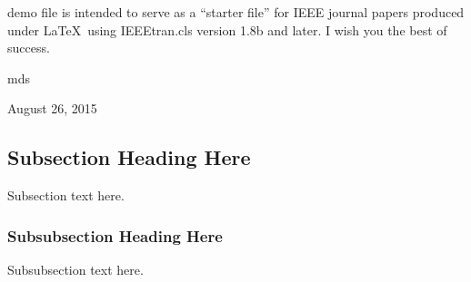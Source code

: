 \documentclass[journal]{IEEEtran}
\begin{document}
 demo file is intended to serve as a ``starter file''
for IEEE journal papers produced under \LaTeX\ using
IEEEtran.cls version 1.8b and later.
I wish you the best of success.

\hfill mds
 
\hfill August 26, 2015

\subsection{Subsection Heading Here}
Subsection text here.


\subsubsection{Subsubsection Heading Here}
Subsubsection text here.


%
%

\end{document}
